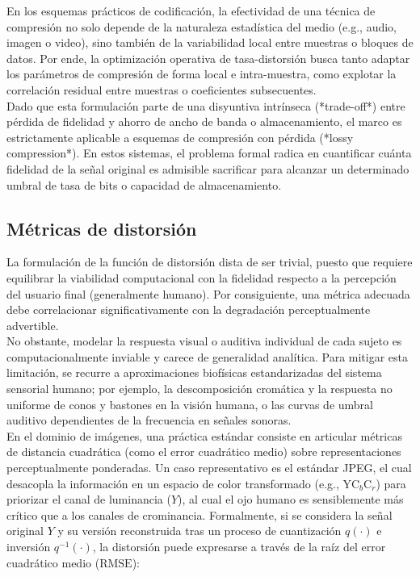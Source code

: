     En los esquemas prácticos de codificación, la efectividad de una técnica de compresión no solo depende de la naturaleza estadística del medio (e.g., audio, imagen o video), sino también de la variabilidad local entre muestras o bloques de datos. Por ende, la optimización operativa de tasa-distorsión busca tanto adaptar los parámetros de compresión de forma local e intra-muestra, como explotar la correlación residual entre muestras o coeficientes subsecuentes. \\

    Dado que esta formulación parte de una disyuntiva intrínseca (*trade-off*) entre pérdida de fidelidad y ahorro de ancho de banda o almacenamiento, el marco es estrictamente aplicable a esquemas de compresión con pérdida (*lossy compression*). En estos sistemas, el problema formal radica en cuantificar cuánta fidelidad de la señal original es admisible sacrificar para alcanzar un determinado umbral de tasa de bits o capacidad de almacenamiento.

    \subsection{Métricas de distorsión}
        La formulación de la función de distorsión dista de ser trivial, puesto que requiere equilibrar la viabilidad computacional con la fidelidad respecto a la percepción del usuario final (generalmente humano). Por consiguiente, una métrica adecuada debe correlacionar significativamente con la degradación perceptualmente advertible.\\

        No obstante, modelar la respuesta visual o auditiva individual de cada sujeto es computacionalmente inviable y carece de generalidad analítica. Para mitigar esta limitación, se recurre a aproximaciones biofísicas estandarizadas del sistema sensorial humano; por ejemplo, la descomposición cromática y la respuesta no uniforme de conos y bastones en la visión humana, o las curvas de umbral auditivo dependientes de la frecuencia en señales sonoras.\\

        En el dominio de imágenes, una práctica estándar consiste en articular métricas de distancia cuadrática (como el error cuadrático medio) sobre representaciones perceptualmente ponderadas. Un caso representativo es el estándar JPEG, el cual desacopla la información en un espacio de color transformado (e.g., $\text{YC}_b\text{C}_r$) para priorizar el canal de luminancia ($Y$), al cual el ojo humano es sensiblemente más crítico que a los canales de crominancia. Formalmente, si se considera la señal original $Y$ y su versión reconstruida tras un proceso de cuantización $q(\cdot)$ e inversión $q^{-1}(\cdot)$, la distorsión puede expresarse a través de la raíz del error cuadrático medio ($\mathrm{RMSE}$):

